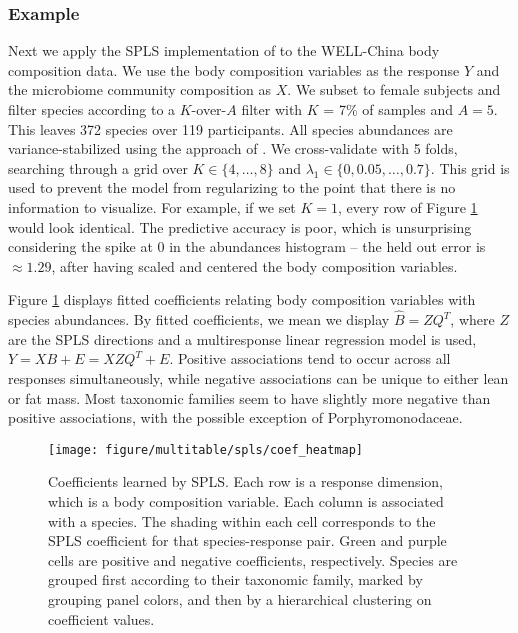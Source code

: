 \documentclass[utf8]{frontiersFPHY} %
\begin{document}
\subsubsection{Example}
\label{subsubsec:spls_example}

Next we apply the SPLS implementation of \cite{chung2012spls} to the WELL-China
body composition data. We use the body composition variables as the response $Y$
and the microbiome community composition as $X$. We subset to female subjects
and filter species according to a $K$-over-$A$ filter with $K$ = 7\% of samples
and $A = 5$. This leaves 372 species over 119 participants. All species
abundances are variance-stabilized using the approach of
\cite{anders2010differential}. We cross-validate with 5 folds, searching through
a grid over $K \in \{4, \dots, 8\}$ and $\lambda_1 \in \{0, 0.05, \dots, 0.7\}$.
This grid is used to prevent the model from regularizing to the point that there
is no information to visualize. For example, if we set $K = 1$, every row of
Figure \ref{fig:spls_coef_heatmap} would look identical. The predictive accuracy
is poor, which is unsurprising considering the spike at 0 in the abundances
histogram -- the held out error is $\approx 1.29$, after having scaled and
centered the body composition variables.

Figure \ref{fig:spls_coef_heatmap} displays fitted coefficients relating body
composition variables with species abundances. By fitted coefficients, we mean
we display $\hat{B} = ZQ^T$, where $Z$ are the SPLS directions and a
multiresponse linear regression model is used, $Y = XB + E = XZQ^T + E$.
Positive associations tend to occur across all responses simultaneously, while
negative associations can be unique to either lean or fat mass. Most taxonomic
families seem to have slightly more negative than positive associations, with
the possible exception of Porphyromonodaceae.

\begin{figure}
  \centering
  \texttt{[image: figure/multitable/spls/coef\_heatmap]}
  \caption{ Coefficients learned by SPLS. Each row is a response dimension,
    which is a body composition variable. Each column is associated with a
    species. The shading within each cell corresponds to the SPLS coefficient
    for that species-response pair. Green and purple cells are positive and
    negative coefficients, respectively. Species are grouped first according to
    their taxonomic family, marked by grouping panel colors, and then by a
    hierarchical clustering on coefficient values.
    \label{fig:spls_coef_heatmap} }
\end{figure}
\end{document}
